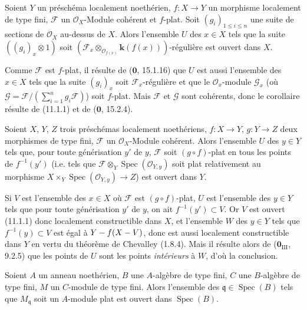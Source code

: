 \begin{corollary}[11.1.4]
\label{IV.11.1.4-fr}
Soient $Y$ un préschéma localement noethérien, $f:X\to Y$ un morphisme
localement de type fini, $\mathcal F$ un $\mathcal O_X$-Module cohérent et
$f$-plat. Soit $(g_i)_{1\leq i\leq n}$ une suite de sections de $\mathcal O_X$
au-dessus de $X$. Alors l'ensemble $U$ des $x\in X$ tels que la suite
$((g_i)_x\otimes1)$ soit
$(\mathcal F_x\otimes_{\mathcal O_{f(x)}}\boldsymbol{k}(f(x)))$-régulière est ouvert dans
$X$.
\end{corollary}

Comme $\mathcal F$ est $f$-plat, il résulte de ($\mathbf 0$, 15.1.16) que $U$
est aussi l'ensemble des $x\in X$
tels que la suite $(g_i)_x$ soit
$\mathcal F_x$-régulière et que le $\mathcal O_x$-module $\mathcal G_x$ (où
$\mathcal G=\mathcal F/(\sum_{i=1}^n g_i\mathcal F)$) soit $f$-plat. Mais
$\mathcal F$ et $\mathcal G$ sont cohérents, donc le corollaire résulte de
(11.1.1) et de ($\mathbf 0$, 15.2.4).

\begin{corollary}[11.1.5]
\label{IV.11.1.5-fr}
Soient $X$, $Y$, $Z$ trois préschémas localement noethériens,
$f:X\to Y$, $g:Y\to Z$ deux morphismes de type fini, $\mathcal F$ un
$\mathcal O_X$-Module cohérent. Alors l'ensemble $U$ des $y\in Y$ tels que,
pour toute générisation $y'$ de $y$, $\mathcal F$ soit $(g\circ f)$-plat en
tous les points de $f^{-1}(y')$ \textup{(i.e.} tels que
$\mathcal F\otimes_Y\operatorname{Spec}(\mathcal O_{Y,y})$ soit plat
relativement au morphisme
$X\times_Y\operatorname{Spec}(\mathcal O_{Y,y})\to Z$\textup{)} est ouvert dans $Y$.
\end{corollary}

Si $V$ est l'ensemble des $x\in X$ où $\mathcal F$ est $(g\circ f)$-plat, $U$
est l'ensemble des $y\in Y$ tels que pour toute générisation $y'$ de $y$, on
ait $f^{-1}(y')\subset V$. Or $V$ est ouvert (11.1.1) donc localement
constructible dans $X$, et l'ensemble $W$ des $y\in Y$ tels que
$f^{-1}(y)\subset V$ est égal à $Y- f(X- V)$, donc est aussi localement
constructible dans $Y$ en vertu du théorème de Chevalley (1.8.4). Mais il
résulte alors de ($\mathbf 0_{\mathrm{III}}$, 9.2.5) que les points de $U$ sont
les points \emph{intérieurs} à $W$, d'où la conclusion.

\begin{corollary}[11.1.6]
\label{IV.11.1.6-fr}
Soient $A$ un anneau noethérien, $B$ une $A$-algèbre de type fini, $C$ une
$B$-algèbre de type fini, $M$ un $C$-module de type fini. Alors l'ensemble des
$\mathfrak q\in\operatorname{Spec}(B)$ tels que $M_{\mathfrak q}$ soit un
$A$-module plat est ouvert dans $\operatorname{Spec}(B)$.
\end{corollary}

